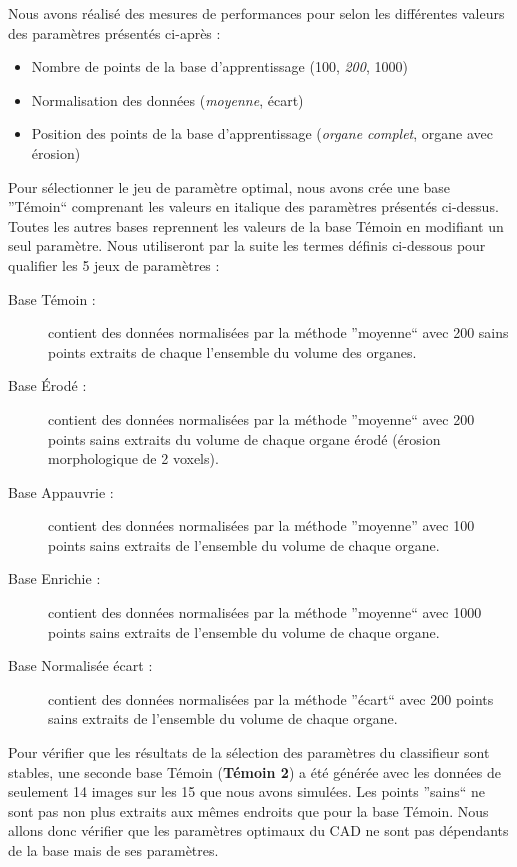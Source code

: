 Nous avons réalisé des mesures de performances pour selon les différentes valeurs des paramètres présentés ci-après :

\begin{itemize}
 \item Nombre de points de la base d'apprentissage (100, \emph{200}, 1000)
 \item Normalisation des données (\emph{moyenne}, écart)
 \item Position des points de la base d'apprentissage (\emph{organe complet}, organe avec érosion)
\end{itemize}

Pour sélectionner le jeu de paramètre optimal, nous avons crée une base ''Témoin`` comprenant les valeurs en italique des paramètres présentés ci-dessus. Toutes les autres bases reprennent les valeurs de la base Témoin en modifiant un seul paramètre. Nous utiliseront par la suite les termes définis ci-dessous pour qualifier les 5 jeux de paramètres :

\begin{description}
 \item[Base Témoin : ] contient des données normalisées par la méthode ''moyenne`` avec 200 sains points extraits de chaque l'ensemble du volume des organes.
 \item[Base Érodé : ] contient des données normalisées par la méthode ''moyenne`` avec 200 points sains extraits du volume de chaque organe érodé (érosion morphologique de 2 voxels).
 \item[Base Appauvrie : ] contient des données normalisées par la méthode ''moyenne'' avec 100 points sains extraits de l'ensemble du volume de chaque organe.
 \item[Base Enrichie : ] contient des données normalisées par la méthode ''moyenne`` avec 1000 points sains extraits de l'ensemble du volume de chaque organe.
 \item[Base Normalisée écart : ] contient des données normalisées par la méthode ''écart`` avec 200 points sains extraits de l'ensemble du volume de chaque organe.
\end{description}

Pour vérifier que les résultats de la sélection des paramètres du classifieur sont stables, une seconde base Témoin (\textbf{Témoin 2}) a été générée avec les données de seulement 14 images sur les 15 que nous avons simulées. Les points ''sains`` ne sont pas non plus extraits aux mêmes endroits que pour la base Témoin. Nous allons donc vérifier que les paramètres optimaux du CAD ne sont pas dépendants de la base mais de ses paramètres.



